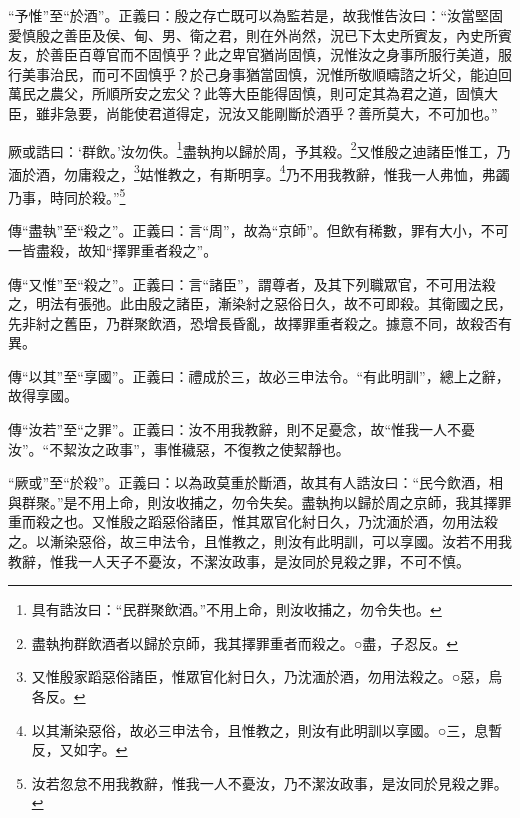 {\noindent\shu{}\fzkt “予惟”至“於酒”。正義曰：殷之存亡既可以為監若是，故我惟告汝曰：“汝當堅固愛慎殷之善臣及侯、甸、男、衛之君，則在外尚然，況已下太史所賓友，內史所賓友，於善臣百尊官而不固慎乎？此之卑官猶尚固慎，況惟汝之身事所服行美道，服行美事治民，而可不固慎乎？於己身事猶當固慎，況惟所敬順疇諮之圻父，能迫回萬民之農父，所順所安之宏父？此等大臣能得固慎，則可定其為君之道，固慎大臣，雖非急要，尚能使君道得定，況汝又能剛斷於酒乎？善所莫大，不可加也。” \par}

厥或誥曰：‘群飲。’汝勿佚。\footnote{具有誥汝曰：“民群聚飲酒。”不用上命，則汝收捕之，勿令失也。}盡執拘以歸於周，予其殺。\footnote{盡執拘群飲酒者以歸於京師，我其擇罪重者而殺之。○盡，子忍反。}又惟殷之迪諸臣惟工，乃湎於酒，勿庸殺之，\footnote{又惟殷家蹈惡俗諸臣，惟眾官化紂日久，乃沈湎於酒，勿用法殺之。○惡，烏各反。}姑惟教之，有斯明享。\footnote{以其漸染惡俗，故必三申法令，且惟教之，則汝有此明訓以享國。○三，息暫反，又如字。}乃不用我教辭，惟我一人弗恤，弗蠲乃事，時同於殺。”\footnote{汝若忽怠不用我教辭，惟我一人不憂汝，乃不潔汝政事，是汝同於見殺之罪。}


{\noindent\zhuan{}\fzbyks 傳“盡執”至“殺之”。正義曰：言“周”，故為“京師”。但飲有稀數，罪有大小，不可一皆盡殺，故知“擇罪重者殺之”。 \par}

{\noindent\zhuan{}\fzbyks 傳“又惟”至“殺之”。正義曰：言“諸臣”，謂尊者，及其下列職眾官，不可用法殺之，明法有張弛。此由殷之諸臣，漸染紂之惡俗日久，故不可即殺。其衛國之民，先非紂之舊臣，乃群聚飲酒，恐增長昏亂，故擇罪重者殺之。據意不同，故殺否有異。 \par}

{\noindent\zhuan{}\fzbyks 傳“以其”至“享國”。正義曰：禮成於三，故必三申法令。“有此明訓”，總上之辭，故得享國。 \par}

{\noindent\zhuan{}\fzbyks 傳“汝若”至“之罪”。正義曰：汝不用我教辭，則不足憂念，故“惟我一人不憂汝”。“不絜汝之政事”，事惟穢惡，不復教之使絜靜也。 \par}

{\noindent\shu{}\fzkt “厥或”至“於殺”。正義曰：以為政莫重於斷酒，故其有人誥汝曰：“民今飲酒，相與群聚。”是不用上命，則汝收捕之，勿令失矣。盡執拘以歸於周之京師，我其擇罪重而殺之也。又惟殷之蹈惡俗諸臣，惟其眾官化紂日久，乃沈湎於酒，勿用法殺之。以漸染惡俗，故三申法令，且惟教之，則汝有此明訓，可以享國。汝若不用我教辭，惟我一人天子不憂汝，不潔汝政事，是汝同於見殺之罪，不可不慎。 \par}

